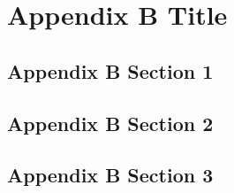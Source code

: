 
\chapter{Appendix B Title} %
\label{AppendixB} %


\section{Appendix B Section 1}

\section{Appendix B Section 2}

\section{Appendix B Section 3}
